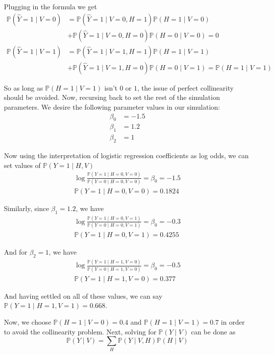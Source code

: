 \documentclass{article}
\begin{document}
Plugging in the formula we get
{\small
\begin{align*}
\mathbb{P}(\hat{Y} = 1\mid V = 0) &= \mathbb{P}(\hat{Y} = 1 \mid V = 0, H = 1)\mathbb{P}(H = 1 \mid V = 0)\\
& + \mathbb{P}(\hat{Y} = 1 \mid V = 0, H = 0)\mathbb{P}(H = 0 \mid V = 0) = 0\\
\mathbb{P}(\hat{Y} = 1\mid V = 1) &= \mathbb{P}(\hat{Y} = 1 \mid V = 1, H = 1)\mathbb{P}(H = 1 \mid V = 1)\\
& + \mathbb{P}(\hat{Y} = 1 \mid V = 1, H = 0)\mathbb{P}(H = 0 \mid V = 1) = \mathbb{P}(H = 1 \mid V = 1)
\end{align*}
}

So as long as $\mathbb{P}(H = 1 \mid V = 1)$ isn't $0$ or $1$, the issue of perfect collinearity should be avoided. Now, recursing back to set the rest of the simulation parameters. We desire the following parameter values in our simulation:
\begin{align*}
\beta_0 &= -1.5\\
\beta_1 &= 1.2\\
\beta_2 &= 1
\end{align*}

Now using the interpretation of logistic regression coefficients as log odds, we can set values of $\mathbb{P}(Y = 1 \mid H, V)$
\begin{align*}
\log{\frac{\mathbb{P}(Y = 1 \mid H =0, V = 0)}{\mathbb{P}(Y = 0 \mid H =0, V = 0)}} = \beta_0 = -1.5\\
\mathbb{P}(Y = 1 \mid H =0, V = 0) = 0.1824
\end{align*}

Similarly, since $\beta_1 = 1.2$, we have 
\begin{align*}
\log{\frac{\mathbb{P}(Y = 1 \mid H =0, V = 1)}{\mathbb{P}(Y = 0 \mid H =0, V = 1)}} = \beta_0 = -0.3\\
\mathbb{P}(Y = 1 \mid H =0, V = 1) = 0.4255
\end{align*}

And for $\beta_2 = 1$, we have 
\begin{align*}
\log{\frac{\mathbb{P}(Y = 1 \mid H =1, V = 0)}{\mathbb{P}(Y = 0 \mid H =1, V = 0)}} = \beta_0 = -0.5\\
\mathbb{P}(Y = 1 \mid H =1, V = 0) = 0.377
\end{align*}

And having settled on all of these values, we can say $\mathbb{P}(Y = 1 \mid H = 1, V = 1) = 0.668$.

Now, we choose $\mathbb{P}(H = 1 \mid V = 0) = 0.4$ and $\mathbb{P}(H = 1 \mid V = 1) = 0.7$ in order to avoid the collinearity problem. Next, solving for $\mathbb{P}(Y \mid V)$ can be done as
\begin{equation*}
\mathbb{P}(Y \mid V) = \sum_{H} \mathbb{P}(Y \mid V, H)\mathbb{P}(H \mid V)
\end{equation*}
\end{document}
